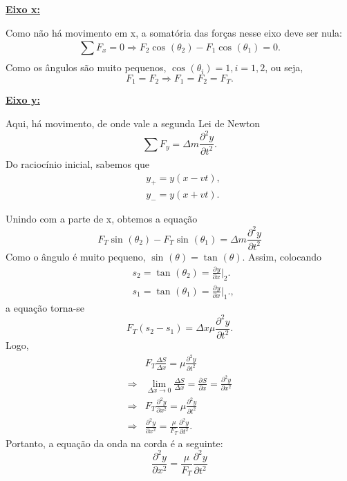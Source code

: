 \documentclass{article}
\begin{document}
 \underline{\textbf{Eixo x:}}
  
  Como não há movimento em x, a somatória das forças nesse eixo deve ser nula: 
    \[
      \sum\limits_{}^{}F_{x} = 0 \Rightarrow F_{2}\cos^{}{(\theta_{2})} - F_{1}\cos^{}{(\theta_{1})} = 0.
    \]
Como os ângulos são muito pequenos, \(\cos^{}{(\theta_{i})} = 1,  i=1, 2\), ou seja,
  \[
    F_{1} = F_{2} \Rightarrow F_{1} = F_{2} = F_{T}.
  \]

  \underline{\textbf{Eixo y:}}
    
  Aqui, há movimento, de onde vale a segunda Lei de Newton 
    \[
      \sum\limits_{}^{}F_{y} = \Delta m \frac{\partial^{2}y}{\partial t^{2}}.
    \]
Do raciocínio inicial, sabemos que 
\begin{align*}
  &y_{+} = y(x-vt),\\
  &y_{-} = y(x+vt).
\end{align*}
  
  Unindo com a parte de x, obtemos a equação 
  \[
    F_{T}\sin^{}{(\theta_{2})} - F_{T}\sin^{}{(\theta_{1})} = \Delta m \frac{\partial^{2}{y}}{\partial{t^{2}}}
  \]
  Como o ângulo é muito pequeno, \(\sin^{}{(\theta )} = \tan^{}{(\theta )}\). Assim, colocando 
 \begin{align*}
   &s_{2} = \tan^{}{(\theta_{2})} = \frac{\partial^{}y}{\partial x^{}}\biggl|_{2}^{}\biggr.\\
   &s_{1} = \tan^{}{(\theta_{1})} = \frac{\partial^{}y}{\partial x^{}}\biggl|_{1}^{}\biggr.,
 \end{align*}
 a equação torna-se 
 \[
   F_{T}(s_{2}-s_{1}) = \Delta x\mu \frac{\partial^{2}y}{\partial t^{2}}.
 \]
Logo, 
\begin{align*}
  &F_{T}\frac{\Delta S}{\Delta x} = \mu \frac{\partial^{2}y}{\partial t^{2}}\\
  \Rightarrow &\lim_{\Delta x\to 0}\frac{\Delta S}{\Delta x}= \frac{\partial^{}S}{\partial x^{}}=\frac{\partial^{2}y}{\partial x^{2}}\\
  \Rightarrow &F_{T}\frac{\partial^{2}y}{\partial x^{2}}=\mu \frac{\partial^{2}y}{\partial t^{2}}\\
  \Rightarrow &\frac{\partial^{2}y}{\partial x^{2}}=\frac{\mu}{F_{T}}\frac{\partial^{2}y}{\partial t^{2}}.
\end{align*}
  Portanto, a equação da onda na corda é a seguinte:
  \[
    \boxed{\frac{\partial^{2}y}{\partial x^{2}}=\frac{\mu}{F_{T}}\frac{\partial^{2}y}{\partial t^{2}}}
  \]
\end{document}
